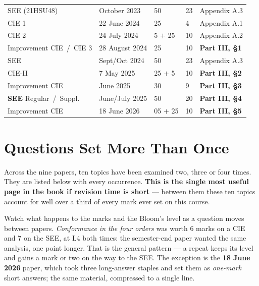 \renewcommand{\arraystretch}{1.35}
\begin{tabular}{@{}P{44mm} P{30mm} C{18mm} C{22mm} P{34mm}@{}}
 &  &  &  & 
  \\ \hline
SEE (21HSU48) & October 2023 & 50 & 23 & Appendix A.3 \\ \hline
CIE 1 & 22 June 2024 & 25 & 4 & Appendix A.1 \\ \hline
CIE 2 & 24 July 2024 & 5 $+$ 25 & 10 & Appendix A.2 \\ \hline
Improvement CIE \,/\, CIE 3 & 28 August 2024 & 25 & 10 &
  \textbf{Part III, \S1} \\ \hline
SEE & Sept/Oct 2024 & 50 & 23 & Appendix A.3 \\ \hline
CIE-II & 7 May 2025 & 25 $+$ 5 & 10 & \textbf{Part III, \S2} \\ \hline
Improvement CIE & June 2025 & 30 & 9 & \textbf{Part III, \S3} \\ \hline
\textbf{SEE} Regular \,/\, Suppl. & June/July 2025 & 50 & 20 &
  \textbf{Part III, \S4} \\ \hline
Improvement CIE & 18 June 2026 & 05 $+$ 25 & 10 & \textbf{Part III, \S5}
  \\ \hline
\end{tabular}

\chapter{Questions Set More Than Once}

Across the nine papers, ten topics have been examined two, three or four
times. They are listed below with every occurrence. \textbf{This is the single
most useful page in the book if revision time is short} --- between them these
ten topics account for well over a third of every mark ever set on this
course.

\vspace{2pt}
Watch what happens to the marks and the Bloom's level as a question moves
between papers. \emph{Conformance in the four orders} was worth 6 marks on a
CIE and 7 on the SEE, at L4 both times: the semester-end paper wanted the same
analysis, one point longer. That is the general pattern --- a repeat keeps its
level and gains a mark or two on the way to the SEE. The exception is the
\textbf{18 June 2026} paper, which took three long-answer staples and set them
as \emph{one-mark} short answers; the same material, compressed to a single
line.

